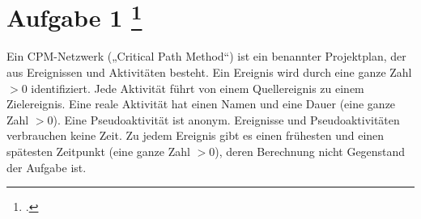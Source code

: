 \documentclass{lehramt-informatik-aufgabe}
\begin{document}
\section{Aufgabe 1
\footcite{examen:66116:2019:09}}

Ein CPM-Netzwerk („Critical Path Method“) ist ein benannter
Projektplan, der aus Ereignissen und Aktivitäten besteht. Ein Ereignis
wird durch eine ganze Zahl $> 0$ identifiziert. Jede Aktivität führt von
einem Quellereignis zu einem Zielereignis. Eine reale Aktivität hat
einen Namen und eine Dauer (eine ganze Zahl $> 0$). Eine Pseudoaktivität
ist anonym. Ereignisse und Pseudoaktivitäten verbrauchen keine Zeit. Zu
jedem Ereignis gibt es einen frühesten und einen spätesten Zeitpunkt
(eine ganze Zahl $> 0$), deren Berechnung nicht Gegenstand der Aufgabe
ist.
\end{document}
